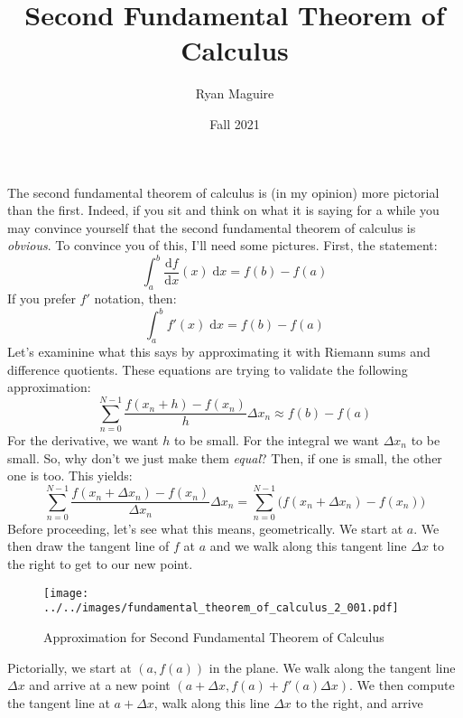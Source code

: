 \documentclass{article}
\title{Second Fundamental Theorem of Calculus}
\author{Ryan Maguire}
\date{Fall 2021}
\theoremstyle{normal}
\theoremstyle{plain}
\begin{document}
    \maketitle
    The second fundamental theorem of calculus is (in my opinion) more
    pictorial than the first. Indeed, if you sit and think on what it is saying
    for a while you may convince yourself that the second fundamental theorem
    of calculus is \textit{obvious}. To convince you of this, I'll need some
    pictures. First, the statement:
    \begin{equation}
        \int_{a}^{b}\frac{\textrm{d}f}{\textrm{d}x}(x)\;\textrm{d}x=f(b)-f(a)
    \end{equation}
    If you prefer $f'$ notation, then:
    \begin{equation}
        \int_{a}^{b}f'(x)\;\textrm{d}x=f(b)-f(a)
    \end{equation}
    Let's examinine what this says by approximating it with Riemann sums and
    difference quotients. These equations are trying to validate the
    following approximation:
    \begin{equation}
        \sum_{n=0}^{N-1}\frac{f(x_{n}+h)-f(x_{n})}{h}\Delta{x}_{n}
            \approx{f}(b)-f(a)
    \end{equation}
    For the derivative, we want $h$ to be small. For the integral we want
    $\Delta{x}_{n}$ to be small. So, why don't we just make them
    \textit{equal}? Then, if one is small, the other one is too. This yields:
    \begin{equation}
        \sum_{n=0}^{N-1}\frac{f(x_{n}+\Delta{x}_{n})-f(x_{n})}{\Delta{x}_{n}}
            \Delta{x}_{n}
            =\sum_{n=0}^{N-1}\Big(f(x_{n}+\Delta{x}_{n})-f(x_{n})\Big)
    \end{equation}
    Before proceeding, let's see what this means, geometrically. We start at
    $a$. We then draw the tangent line of $f$ at $a$ and we walk along this
    tangent line $\Delta{x}$ to the right to get to our new point.
    \begin{figure}[H]
        \centering
        \texttt{[image: ../../images/fundamental\_theorem\_of\_calculus\_2\_001.pdf]}
        \caption{Approximation for Second Fundamental Theorem of Calculus}
    \end{figure}
    Pictorially, we start at $(a,f(a))$ in the plane. We walk along the
    tangent line $\Delta{x}$ and arrive at a new point
    $(a+\Delta{x},f(a)+f'(a)\Delta{x})$. We then compute the tangent line at
    $a+\Delta{x}$, walk along this line $\Delta{x}$ to the right, and arrive
\end{document}
